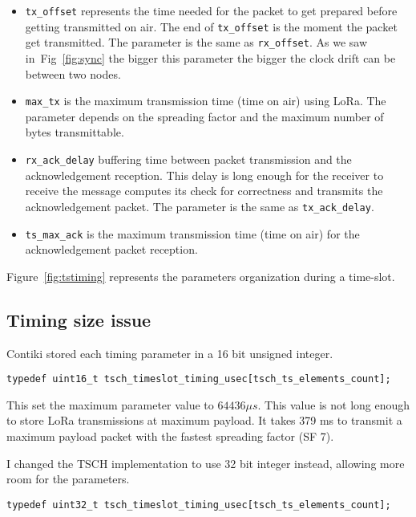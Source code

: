 \begin{itemize}
  \item \lstinline{tx_offset} represents the time needed for the packet to get
    prepared before getting transmitted on air. The end of
    \lstinline{tx_offset} is the moment the packet get transmitted. 
    The parameter is the same as \lstinline{rx_offset}.
    As we saw in~Fig~\ref{fig:sync} the bigger this parameter the bigger the
    clock drift can be between two nodes.
  \item \lstinline{max_tx} is the maximum transmission time (time on air) using
    LoRa. The parameter depends on the spreading factor and the maximum number
    of bytes transmittable.
  \item \lstinline{rx_ack_delay} buffering time between packet transmission and
    the acknowledgement reception. This delay is long enough for the receiver
    to receive the message computes its check for correctness and transmits the acknowledgement packet.
    The parameter is the same as \lstinline{tx_ack_delay}.
  \item \lstinline{ts_max_ack} is the maximum transmission time (time on air) for
    the acknowledgement packet reception.
\end{itemize}

Figure~\ref{fig:tstiming} represents the parameters organization during
a time-slot.



\subsection{Timing size issue}

Contiki stored each timing parameter in a 16 bit unsigned integer.

\begin{lstlisting}
typedef uint16_t tsch_timeslot_timing_usec[tsch_ts_elements_count];
\end{lstlisting}

This set the maximum parameter value to $64436\mu s$.
This value is not long enough to store LoRa transmissions at maximum payload.
It takes 379 ms to transmit a maximum payload packet with the fastest spreading
factor (SF 7).

I changed the TSCH implementation to use 32 bit integer instead, allowing more
room for the parameters.

\begin{lstlisting}
typedef uint32_t tsch_timeslot_timing_usec[tsch_ts_elements_count];
\end{lstlisting}

